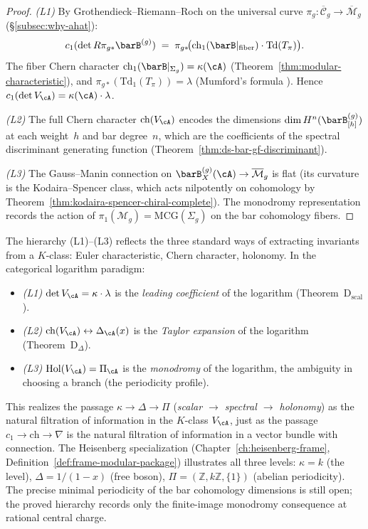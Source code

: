 \begin{proof}
\emph{(L1)}\enspace
By Grothendieck--Riemann--Roch on the universal curve
$\pi_g\colon \overline{\mathcal{C}}_g \to \overline{\mathcal{M}}_g$
(\S\ref{subsec:why-ahat}):
\[
c_1(\det R\pi_{g*} \barB^{(g)})
\;=\;
\pi_{g*}\!\bigl(\mathrm{ch}_1(\barB|_{\mathrm{fiber}})
\cdot \mathrm{Td}(T_\pi)\bigr).
\]
The fiber Chern character $\mathrm{ch}_1(\barB|_{\Sigma_g})
= \kappa(\cA)$ (Theorem~\ref{thm:modular-characteristic}),
and $\pi_{g*}(\mathrm{Td}_1(T_\pi)) = \lambda$
(Mumford's formula \cite{Mumford83}).
Hence $c_1(\det V_\cA) = \kappa(\cA) \cdot \lambda$.

\emph{(L2)}\enspace
The full Chern character $\mathrm{ch}(V_\cA)$
encodes the dimensions $\dim H^n(\barB^{(g)}_{[h]})$ at each
weight~$h$ and bar degree~$n$, which are the coefficients of the
spectral discriminant generating function
(Theorem~\ref{thm:ds-bar-gf-discriminant}).

\emph{(L3)}\enspace
The Gauss--Manin connection on
$\barB^{(g)}_X(\cA) \to \overline{\mathcal{M}}_g$
is flat (its curvature is the Kodaira--Spencer class, which acts
nilpotently on cohomology by
Theorem~\ref{thm:kodaira-spencer-chiral-complete}).
The monodromy representation records the action
of $\pi_1(\mathcal{M}_g) = \mathrm{MCG}(\Sigma_g)$ on the bar
cohomology fibers.
\end{proof}

\begin{remark}
\label{rem:three-readings-V}
The hierarchy (L1)--(L3) reflects the three standard ways of
extracting invariants from a $K$-class: Euler characteristic,
Chern character, holonomy. In the categorical logarithm paradigm:
\begin{itemize}
\item \emph{(L1)} $\det V_\cA = \kappa \cdot \lambda$
 is the \emph{leading coefficient} of the logarithm
 (Theorem~D$_{\mathrm{scal}}$).
\item \emph{(L2)} $\mathrm{ch}(V_\cA) \leftrightarrow \Delta_\cA(x)$
 is the \emph{Taylor expansion} of the logarithm
 (Theorem~D$_\Delta$).
\item \emph{(L3)} $\mathrm{Hol}(V_\cA) = \Pi_\cA$
 is the \emph{monodromy} of the logarithm, the ambiguity in
 choosing a branch (the periodicity profile).
\end{itemize}
This realizes the passage
$\kappa \to \Delta \to \Pi$
(\emph{scalar $\to$ spectral $\to$ holonomy}) as the natural
filtration of information in the $K$-class $V_\cA$, just as the
passage $c_1 \to \mathrm{ch} \to \nabla$ is the natural filtration
of information in a vector bundle with connection. The Heisenberg
specialization
(Chapter~\ref{ch:heisenberg-frame},
 Definition~\ref{def:frame-modular-package})
illustrates all three levels: $\kappa = k$ (the level),
$\Delta = 1/(1-x)$ (free boson),
$\Pi = (\mathbb{Z}, k\mathbb{Z}, \{1\})$ (abelian periodicity).
The precise minimal periodicity of the bar cohomology dimensions is
still open; the proved hierarchy records only the finite-image
monodromy consequence at rational central charge.
\end{remark}

